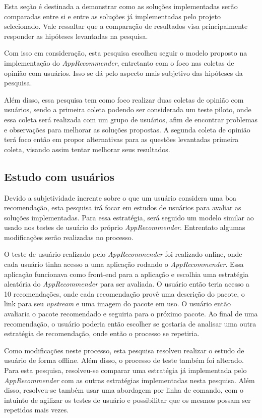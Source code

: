 Esta seção é destinada a demonstrar como as soluções implementadas serão
comparadas entre si e entre as soluções já implementadas pelo projeto
selecionado. Vale ressaltar que a comparação de resultados visa principalmente
responder as hipóteses levantadas na pesquisa.

Com isso em consideração, esta pesquisa escolheu seguir o modelo proposto na
implementação do \textit{AppRecommender}, entretanto com o foco nas
coletas de opinião com usuários. Isso se dá pelo aspecto mais subjetivo das
hipóteses da pesquisa.

Além disso, essa pesquisa tem como foco realizar duas coletas de opinião com usuários,
sendo a primeira coleta podendo ser considerada um teste piloto, onde essa
coleta será realizada com um grupo de usuários, afim de encontrar problemas e
observações para melhorar as soluções propostas. A segunda coleta de opinião
terá foco então em propor alternativas para as questões levantadas
primeira coleta, visando assim tentar melhorar seus resultados.

\subsection{Estudo com usuários}\label{sec:estudo_usuario}

Devido a subjetividade inerente sobre o que um usuário considera uma boa
recomendação, esta pesquisa irá focar em estudos de usuários para
avaliar as soluções implementadas. Para essa estratégia, será seguido um modelo
similar ao usado nos testes de usuário do próprio \textit{AppRecommender}. Entrentato
algumas modificações serão realizadas no processo.

O teste de usuário realizado pelo \textit{AppRecommender} foi realizado online, onde cada
usuário tinha acesso a uma aplicação rodando o \textit{AppRecommender}. Essa aplicação
funcionava como front-end para a aplicação e escolhia uma estratégia aleatória
do \textit{AppRecommender} para ser avaliada. O usuário então teria acesso a 10
recomendações, onde cada recomendação provê uma descrição do
pacote, o link para seu \textit{upstream} e uma imagem do pacote em uso. O
usuário então avaliaria o pacote recomendado e seguiria para o próximo pacote.
Ao final de uma recomendação, o usuário poderia então escolher se gostaria de
analisar uma outra estratégia de recomendação, onde então o processo se
repetiria.

Como modificações neste processo, esta pesquisa resolveu realizar o estudo de
usuário de forma offline. Além disso, o processo de teste também foi alterado.
Para esta pesquisa, resolveu-se comparar uma estratégia já implementada pelo
\textit{AppRecommender} com as outras estratégias implementadas nesta pesquisa.
Além disso, resolveu-se também usar uma abordagem por linha de
comando, com o intuinto de agilizar os testes de usuário e possibilitar que os
mesmos possam ser repetidos mais vezes.

